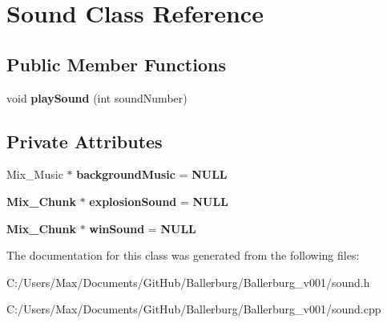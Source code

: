 \section{Sound Class Reference}
\label{class_sound}
\subsection*{Public Member Functions}
\begin{DoxyCompactItemize}
\item 
void {\bfseries play\+Sound} (int sound\+Number)\label{class_sound_a24976b9227b585221a17e536c2e15679}

\end{DoxyCompactItemize}
\subsection*{Private Attributes}
\begin{DoxyCompactItemize}
\item 
Mix\+\_\+\+Music $\ast$ {\bfseries background\+Music} = {\bf N\+U\+L\+L}\label{class_sound_acb890463b848b6128003cb96eddee6ba}

\item 
{\bf Mix\+\_\+\+Chunk} $\ast$ {\bfseries explosion\+Sound} = {\bf N\+U\+L\+L}\label{class_sound_a0dace0f53c818d655e011e651b6a57f3}

\item 
{\bf Mix\+\_\+\+Chunk} $\ast$ {\bfseries win\+Sound} = {\bf N\+U\+L\+L}\label{class_sound_ac4971240764c9b6ad19348a0cd6ea1d5}

\end{DoxyCompactItemize}


The documentation for this class was generated from the following files\+:\begin{DoxyCompactItemize}
\item 
C\+:/\+Users/\+Max/\+Documents/\+Git\+Hub/\+Ballerburg/\+Ballerburg\+\_\+v001/sound.\+h\item 
C\+:/\+Users/\+Max/\+Documents/\+Git\+Hub/\+Ballerburg/\+Ballerburg\+\_\+v001/sound.\+cpp\end{DoxyCompactItemize}
